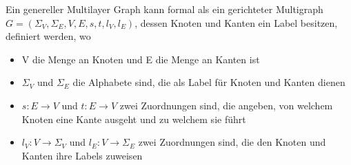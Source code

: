 Ein genereller Multilayer Graph kann formal als ein gerichteter Multigraph\cite{multiLayerMath} $G = (\Sigma_{V}, \Sigma_{E}, V, E, s, t, l_{V}, l_{E})$, dessen Knoten und Kanten ein Label besitzen, definiert werden, wo

\begin{itemize}
  \item V die Menge an Knoten und E die Menge an Kanten ist
  \item $\Sigma_{V}$ und $\Sigma_{E}$ die Alphabete sind, die als Label für Knoten und Kanten dienen
  \item $s: E \rightarrow V$ und $t: E \rightarrow V$ zwei Zuordnungen sind, die angeben, von welchem Knoten eine Kante ausgeht und zu welchem sie führt
  \item $l_{V}: V \rightarrow \Sigma_{V}$ und $l_{E}: V \rightarrow \Sigma_{E}$ zwei Zuordnungen sind, die den Knoten und Kanten ihre Labels zuweisen
\end{itemize}
